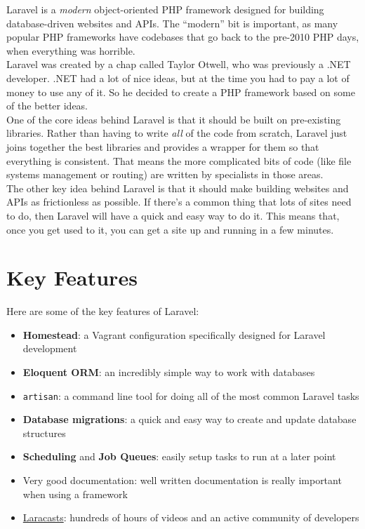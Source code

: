 Laravel is a \textit{modern} object-oriented PHP framework designed for building database-driven websites and APIs. The ``modern'' bit is important, as many popular PHP frameworks have codebases that go back to the pre-2010 PHP days, when everything was horrible.
\\

Laravel was created by a chap called Taylor Otwell, who was previously a .NET developer. .NET had a lot of nice ideas, but at the time you had to pay a lot of money to use any of it. So he decided to create a PHP framework based on some of the better ideas.
\\

One of the core ideas behind Laravel is that it should be built on pre-existing libraries. Rather than having to write \textit{all} of the code from scratch, Laravel just joins together the best libraries and provides a wrapper for them so that everything is consistent. That means the more complicated bits of code (like file systems management or routing) are written by specialists in those areas.
\\

The other key idea behind Laravel is that it should make building websites and APIs as frictionless as possible. If there's a common thing that lots of sites need to do, then Laravel will have a quick and easy way to do it. This means that, once you get used to it, you can get a site up and running in a few minutes.

\section{Key Features}

Here are some of the key features of Laravel:

\begin{itemize}
    \item \textbf{Homestead}: a Vagrant configuration specifically designed for Laravel development
    \item \textbf{Eloquent ORM}: an incredibly simple way to work with databases
    \item \texttt{artisan}: a command line tool for doing all of the most common Laravel tasks
    \item \textbf{Database migrations}: a quick and easy way to create and update database structures
    \item \textbf{Scheduling} and \textbf{Job Queues}: easily setup tasks to run at a later point
    \item Very good documentation: well written documentation is really important when using a framework
    \item \href{https://laracasts.com}{Laracasts}: hundreds of hours of videos and an active community of developers
\end{itemize}



